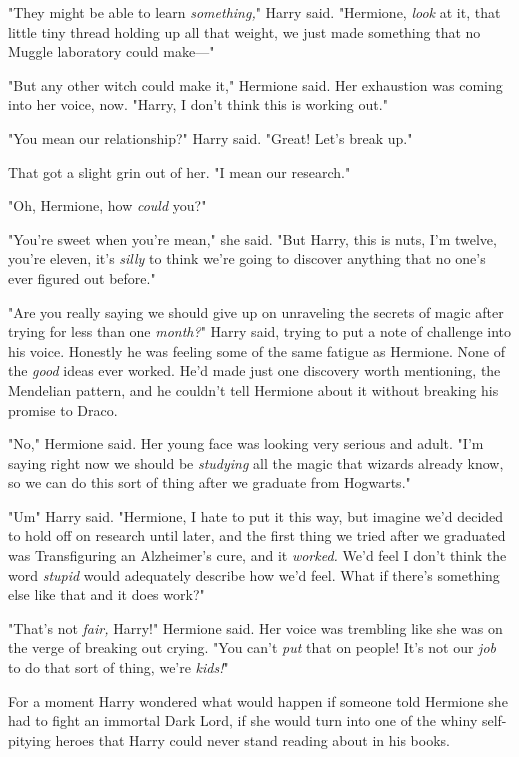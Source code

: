 "They might be able to learn \emph{something,}" Harry said. "Hermione,
\emph{look} at it, that little tiny thread holding up all that weight, we just
made something that no Muggle laboratory could make\mbox{---}"

"But any other witch could make it," Hermione said. Her exhaustion was coming
into her voice, now. "Harry, I don't think this is working out."

"You mean our relationship?" Harry said. "Great! Let's break up."

That got a slight grin out of her. "I mean our research."

"Oh, Hermione, how \emph{could} you?"

"You're sweet when you're mean," she said. "But Harry, this is nuts, I'm
twelve, you're eleven, it's \emph{silly} to think we're going to discover
anything that no one's ever figured out before."

"Are you really saying we should give up on unraveling the secrets of magic
after trying for less than one \emph{month?}" Harry said, trying to put a note
of challenge into his voice. Honestly he was feeling some of the same fatigue
as Hermione. None of the \emph{good} ideas ever worked. He'd made just one
discovery worth mentioning, the Mendelian pattern, and he couldn't tell
Hermione about it without breaking his promise to Draco.

"No," Hermione said. Her young face was looking very serious and adult. "I'm
saying right now we should be \emph{studying} all the magic that wizards
already know, so we can do this sort of thing after we graduate from Hogwarts."

"Um{\el}" Harry said. "Hermione, I hate to put it this way, but imagine we'd
decided to hold off on research until later, and the first thing we tried after
we graduated was Transfiguring an Alzheimer's cure, and it \emph{worked.} We'd
feel{\el} I don't think the word \emph{stupid} would adequately describe how
we'd feel. What if there's something else like that and it does work?"

"That's not \emph{fair,} Harry!" Hermione said. Her voice was trembling like
she was on the verge of breaking out crying. "You can't \emph{put} that on
people! It's not our \emph{job} to do that sort of thing, we're \emph{kids!}"

For a moment Harry wondered what would happen if someone told Hermione she had
to fight an immortal Dark Lord, if she would turn into one of the whiny
self-pitying heroes that Harry could never stand reading about in his books.

